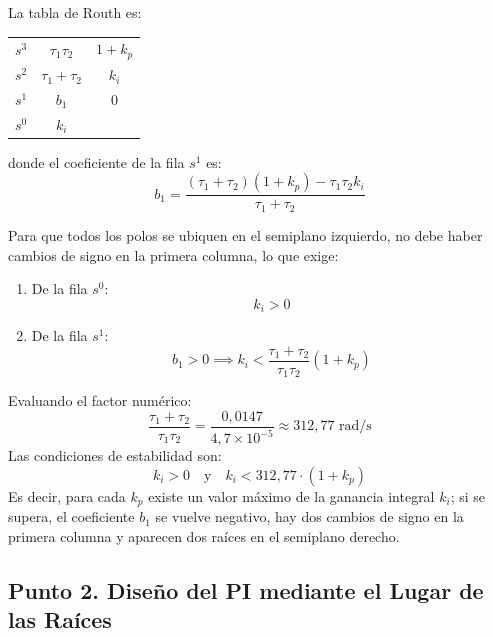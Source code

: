 \documentclass[11pt,a4paper]{article}
\begin{document}
La tabla de Routh es:
\begin{table}[H]
\centering
\begin{tabular}{c | c c}
$s^3$ & $\tau_1 \tau_2$ & $1 + k_p$ \\
$s^2$ & $\tau_1 + \tau_2$ & $k_i$ \\
$s^1$ & $b_1$ & $0$ \\
$s^0$ & $k_i$ & 
\end{tabular}
\end{table}

donde el coeficiente de la fila $s^1$ es:
\begin{equation}
    b_1 = \frac{(\tau_1 + \tau_2)(1 + k_p) - \tau_1 \tau_2 k_i}{\tau_1 + \tau_2}
\end{equation}

Para que todos los polos se ubiquen en el semiplano izquierdo, no debe haber cambios de signo en la primera columna, lo que exige:
\begin{enumerate}
    \item De la fila $s^0$:
    \begin{equation}
        k_i > 0
    \end{equation}
    \item De la fila $s^1$:
    \begin{equation}
        b_1 > 0 \implies k_i < \frac{\tau_1 + \tau_2}{\tau_1 \tau_2} (1 + k_p)
    \end{equation}
\end{enumerate}

Evaluando el factor numérico:
\begin{equation}
    \frac{\tau_1 + \tau_2}{\tau_1 \tau_2} = \frac{0{,}0147}{4{,}7\times 10^{-5}} \approx 312{,}77\text{ rad/s}
\end{equation}
Las condiciones de estabilidad son:
\begin{equation}
    k_i > 0 \quad \text{y} \quad k_i < 312{,}77 \cdot (1 + k_p)
\end{equation}
Es decir, para cada $k_p$ existe un valor máximo de la ganancia integral $k_i$; si se supera, el coeficiente $b_1$ se vuelve negativo, hay dos cambios de signo en la primera columna y aparecen dos raíces en el semiplano derecho.

\subsection*{Punto 2. Diseño del PI mediante el Lugar de las Raíces}
\end{document}

